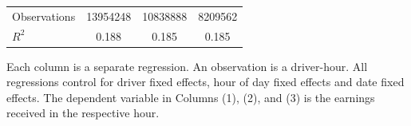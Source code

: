 \documentclass[reviewmode,AEJ]{AEA}
\begin{document}
\begin{table}
{\begin{tabularx}{\textwidth}{l@{\extracolsep{\fill}}*{3}{S}}
			\midrule
			Observations        &\num{13954248}         &\num{10838888}         &\num{8209562}\\
			$R^2$             &     {0.188}         &     {0.185}         &     {0.185} \\
			\bottomrule
			\end{tabularx}
			}
			\begin{tablenotes}
				Each column is a separate regression. An observation is a driver-hour. All regressions control for driver fixed effects, hour of day fixed effects and date fixed effects. The dependent variable in Columns (1), (2), and (3) is the earnings received in the respective hour.
			\end{tablenotes}
%

	\vspace{1cm}


\end{table}
\end{document}
